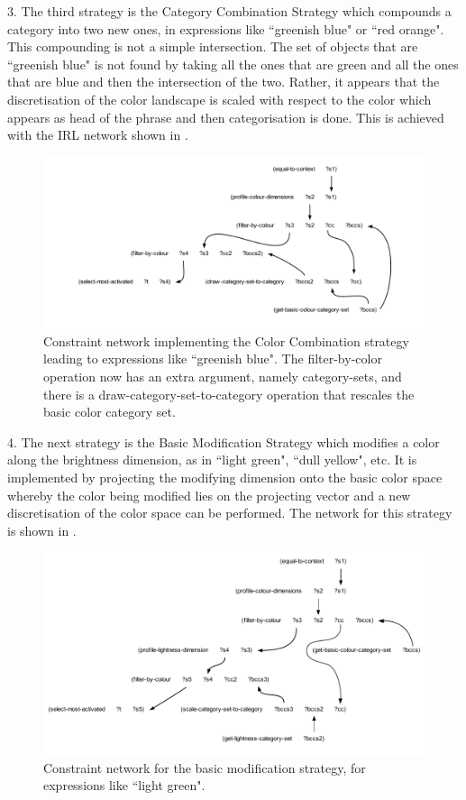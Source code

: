 3. The third strategy is the {\bfshape Category Combination Strategy} which compounds a category into two new ones, in 
expressions like ``greenish blue" or ``red orange". This compounding is not a simple intersection. The set of objects  
that are ``greenish blue" is not found by taking all the ones that are green and all the ones that are blue and then 
the intersection of the two. Rather, it appears that the discretisation of the color landscape is scaled with respect 
to the color which appears as head of the phrase and then categorisation is done. This is achieved with the IRL network 
shown in . 
\begin{figure}[htbp]
  \centerline{\includegraphics[width=1.0\textwidth]{chap11/figs/combi}}
\caption{\label{fig:combi} 
Constraint network implementing the Color Combination strategy leading to expressions like ``greenish blue". 
The filter-by-color operation now has an extra argument, namely category-sets,  
and there is a draw-category-set-to-category operation that rescales the basic color category set.}
\end{figure}

4. The next strategy is the {\bfshape Basic Modification Strategy} which modifies a color along the brightness dimension, as in 
``light green", ``dull yellow", etc. It is implemented by projecting the modifying dimension onto the basic color space 
whereby the color being modified lies on the projecting vector and a new discretisation of the color space can be 
performed. The network for this strategy is shown in . 
\begin{figure}[htbp]
  \centerline{\includegraphics[width=1.0\textwidth]{chap11/figs/modi}}
\caption{\label{fig:modi} 
Constraint network for the basic modification strategy, for expressions like ``light green".}
\end{figure}

